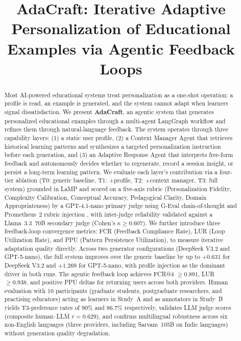 \documentclass[conference]{IEEEtran}
\begin{document}
\title{AdaCraft: Iterative Adaptive Personalization of Educational Examples via Agentic Feedback Loops}

\author{}

\maketitle

\begin{abstract}
Most AI-powered educational systems treat personalization as a one-shot operation: a profile is read, an example is generated, and the system cannot adapt when learners signal dissatisfaction. We present \textbf{AdaCraft}, an agentic system that generates personalized educational examples through a multi-agent LangGraph workflow and refines them through natural-language feedback. The system operates through three capability layers: (1) a static user profile, (2) a Context Manager Agent that retrieves historical learning patterns and synthesizes a targeted personalization instruction before each generation, and (3) an Adaptive Response Agent that interprets free-form feedback and autonomously decides whether to regenerate, record a session insight, or persist a long-term learning pattern. We evaluate each layer's contribution via a four-tier ablation (T0: generic baseline, T1: +profile, T2: +context manager, T3: full system) grounded in LaMP \cite{b3} and scored on a five-axis rubric (Personalization Fidelity, Complexity Calibration, Conceptual Accuracy, Pedagogical Clarity, Domain Appropriateness) by a GPT-4.1-nano primary judge using G-Eval chain-of-thought \cite{b4} and Prometheus~2 rubric injection \cite{b5}, with inter-judge reliability validated against a Llama~3.3~70B secondary judge (Cohen's $\kappa \geq 0.607$). We further introduce three feedback-loop convergence metrics: FCR (Feedback Compliance Rate), LUR (Loop Utilization Rate), and PPU (Pattern Persistence Utilization), to measure iterative adaptation quality directly. Across two generator configurations (DeepSeek V3.2 and GPT-5-nano), the full system improves over the generic baseline by up to $+0.631$ for DeepSeek V3.2 and $+1.269$ for GPT-5-nano, with profile injection as the dominant driver in both runs. The agentic feedback loop achieves FCR@4 $\geq 0.891$, LUR $\geq 0.938$, and positive PPU deltas for returning users across both providers. Human evaluation with 10 participants (graduate students, postgraduate researchers, and practising educators) acting as learners in Study~A and as annotators in Study~B yields T3-preference rates of 90\% and 86.7\% respectively, validates LLM judge scores (composite human--LLM $r = 0.629$), and confirms multilingual robustness across six non-English languages (three providers, including Sarvam~105B on Indic languages) without generation quality degradation.
\end{abstract}
\end{document}
